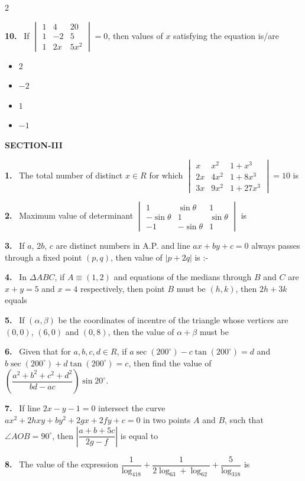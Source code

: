 \documentclass[10pt]{extarticle}
\newcommand{\sect}[1]{\par\smallskip\noindent\textbf{#1}\par}
\newcommand{\qn}[1]{\par\smallskip\noindent\textbf{#1.}~}
\newenvironment{qoptions}{\begin{itemize}[leftmargin=1.8em,itemsep=1pt,topsep=2pt,label={}]}{\end{itemize}}
\newcommand{\opt}[2]{\item[(#1)] #2}
\begin{document}
\begin{multicols}{2}
\qn{10} If $\begin{vmatrix}1&4&20\\1&-2&5\\1&2x&5x^2\end{vmatrix}=0$, then values of $x$ satisfying the equation is/are
\begin{qoptions}
\opt{A}{$2$}
\opt{B}{$-2$}
\opt{C}{$1$}
\opt{D}{$-1$}
\end{qoptions}
\sect{SECTION-III}
\qn{1} The total number of distinct $x\in R$ for which $\begin{vmatrix}x&x^2&1+x^3\\2x&4x^2&1+8x^3\\3x&9x^2&1+27x^3\end{vmatrix}=10$ is
\qn{2} Maximum value of determinant {\footnotesize$\begin{vmatrix}1&\sin\theta&1\\-\sin\theta&1&\sin\theta\\-1&-\sin\theta&1\end{vmatrix}$} is
\qn{3} If $a$, $2b$, $c$ are distinct numbers in A.P. and line $ax+by+c=0$ always passes through a fixed point $(p,q)$, then value of $|p+2q|$ is :-
\qn{4} In $\Delta ABC$, if $A\equiv(1,2)$ and equations of the medians through $B$ and $C$ are $x+y=5$ and $x=4$ respectively, then point $B$ must be $(h,k)$, then $2h+3k$ equals
\qn{5} If $(\alpha,\beta)$ be the coordinates of incentre of the triangle whose vertices are $(0,0)$, $(6,0)$ and $(0,8)$, then the value of $\alpha+\beta$ must be
\qn{6} Given that for $a,b,c,d\in R$, if $a\sec(200^\circ)-c\tan(200^\circ)=d$ and $b\sec(200^\circ)+d\tan(200^\circ)=c$, then find the value of $\left(\dfrac{a^2+b^2+c^2+d^2}{bd-ac}\right)\sin20^\circ$.
\qn{7} If line $2x-y-1=0$ intersect the curve $ax^2+2hxy+by^2+2gx+2fy+c=0$ in two points $A$ and $B$, such that $\angle AOB=90^\circ$, then $\left|\dfrac{a+b+5c}{2g-f}\right|$ is equal to
\qn{8} The value of the expression $\dfrac1{\log_418}+\dfrac1{2\log_63+\log_62}+\dfrac5{\log_318}$ is
\end{multicols}
\end{document}
